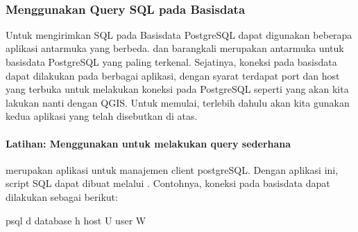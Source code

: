 \documentclass[letterpaper,10pt,english]{sphinxmanual}
\begin{document}
 


\subsubsection{Menggunakan Query SQL pada Basisdata}
\label{\detokenize{sesi2/relationaldb:menggunakan-query-sql-pada-basisdata}}
Untuk mengirimkan SQL pada Basisdata PostgreSQL dapat digunakan beberapa aplikasi antarmuka yang berbeda.  dan  barangkali merupakan antarmuka untuk basisdata PostgreSQL yang paling terkenal. Sejatinya, koneksi pada basisdata dapat dilakukan pada berbagai aplikasi, dengan syarat terdapat port dan host yang terbuka untuk melakukan koneksi pada PostgreSQL seperti yang akan kita lakukan nanti dengan QGIS. Untuk memulai, terlebih dahulu akan kita gunakan kedua aplikasi yang telah disebutkan di atas.


\paragraph{Latihan: Menggunakan  untuk melakukan query sederhana}
\label{\detokenize{sesi2/relationaldb:latihan-menggunakan-psql-untuk-melakukan-query-sederhana}}
 merupakan aplikasi untuk manajemen client postgreSQL. Dengan aplikasi ini, script SQL dapat dibuat melalui . Contohnya, koneksi pada basisdata dapat dilakukan sebagai berikut:

\begin{sphinxVerbatim}[commandchars=\\\{\}]
psql \PYGZhy{}d database \PYGZhy{}h host \PYGZhy{}U  user \PYGZhy{}W
\end{sphinxVerbatim}
\end{document}
